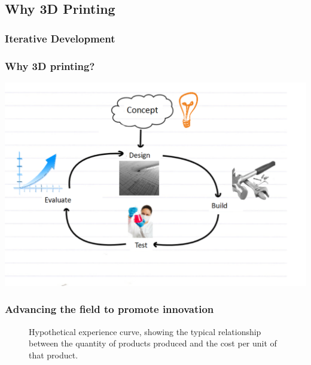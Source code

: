 \documentclass[10pt, compress]{beamer}
\begin{document}
\subsection{Why 3D Printing}
\subsubsection{Iterative Development}
\begin{frame}[fragile]
\frametitle{Why 3D printing?}
\begin{center}\includegraphics[width=.9\textwidth]{iterative_cycle.PNG}\end{center}


\end{frame}

\begin{frame}[fragile]
\subsubsection{Advancing the field to promote innovation}
\begin{center}
\begin{figure}[h !]
\caption{\centering Hypothetical experience curve, showing the typical relationship between the quantity of products produced and the cost per unit of that product.}
\end{figure}
\end{center}
\end{frame}
\end{document}
